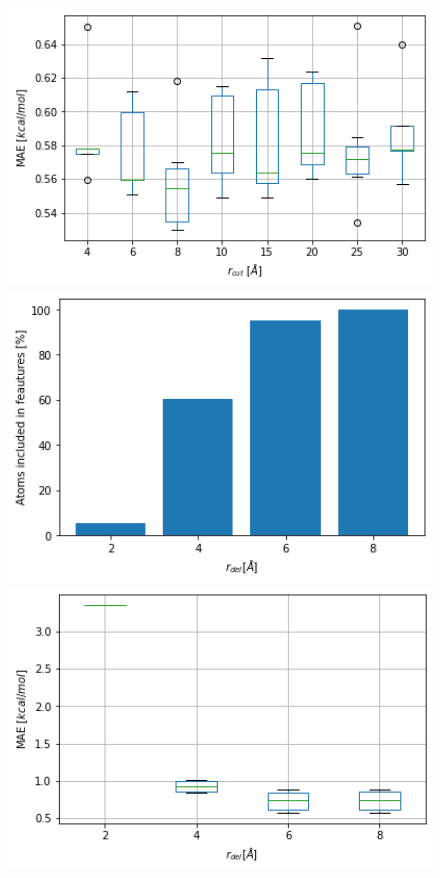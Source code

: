 \begin{figure}[!htb]
    \includegraphics[width=1.0\textwidth]{figures/regression/snap/rcut-compare.png} %
  \endminipage\hfill
    \includegraphics[width=1.0\textwidth]{figures/regression/snap/cut-sphere-perc.png}
  \endminipage\hfill
    \includegraphics[width=1.0\textwidth]{figures/regression/snap/cut-sphere-comp.png}

\end{figure}
